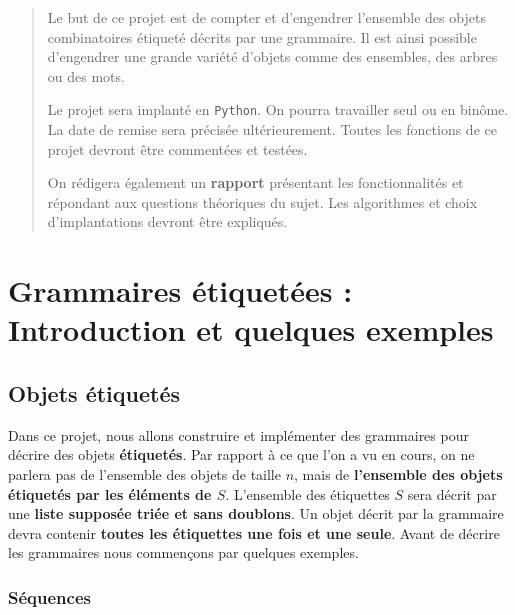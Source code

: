 \documentclass[11pt]{article}
\newcommand{\Python}{\texttt{Python}\xspace}
\begin{document}
\maketitle

\begin{abstract}
  Le but de ce projet est de compter et d'engendrer l'ensemble des objets
  combinatoires étiqueté décrits par une grammaire. Il est ainsi possible
  d'engendrer une grande variété d'objets comme des ensembles, des arbres ou
  des mots.  \smallskip

  Le projet sera implanté en \Python{}. On pourra travailler seul ou en
  binôme. La date de remise sera précisée ultérieurement. Toutes les fonctions
  de ce projet devront être commentées et testées.

  On rédigera également un \textbf{rapport} présentant les fonctionnalités et
  répondant aux questions théoriques du sujet. Les algorithmes et choix
  d'implantations devront être expliqués.
\end{abstract}

\section{Grammaires étiquetées : Introduction et quelques exemples}

\subsection{Objets étiquetés}


Dans ce projet, nous allons construire et implémenter des grammaires pour
décrire des objets \textbf{étiquetés}. Par rapport à ce que l'on a vu en
cours, on ne parlera pas de l'ensemble des objets de taille $n$, mais de
\textbf{l'ensemble des objets étiquetés par les éléments de $S$}. L'ensemble
des étiquettes $S$ sera décrit par une \textbf{liste supposée triée et sans
  doublons}. Un objet décrit par la grammaire devra contenir \textbf{toutes
  les étiquettes une fois et une seule}. Avant de décrire les grammaires nous
commençons par quelques exemples.

\subsubsection{Séquences}
\label{seq:sequences}
\end{document}
